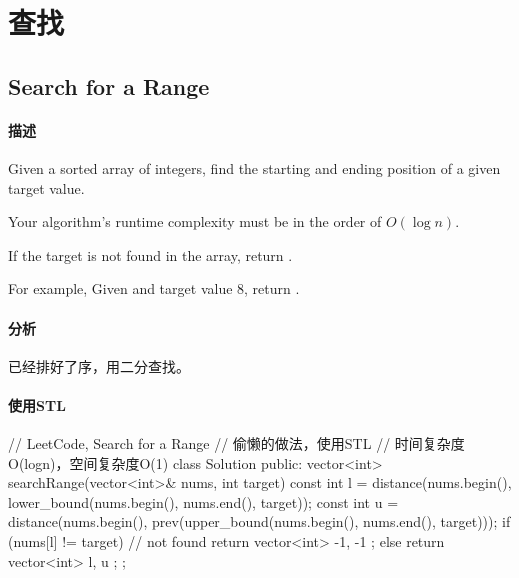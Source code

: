 \chapter{查找}


\section{Search for a Range} %
\label{sec:search-for-a-range}


\subsubsection{描述}
Given a sorted array of integers, find the starting and ending position of a given target value.

Your algorithm's runtime complexity must be in the order of $O(\log n)$.

If the target is not found in the array, return \code{[-1, -1]}.

For example,
Given \code{[5, 7, 7, 8, 8, 10]} and target value 8,
return \code{[3, 4]}.


\subsubsection{分析}
已经排好了序，用二分查找。


\subsubsection{使用STL}
\begin{Code}
// LeetCode, Search for a Range
// 偷懒的做法，使用STL
// 时间复杂度O(logn)，空间复杂度O(1)
class Solution {
public:
    vector<int> searchRange(vector<int>& nums, int target) {
        const int l = distance(nums.begin(), lower_bound(nums.begin(), nums.end(), target));
        const int u = distance(nums.begin(), prev(upper_bound(nums.begin(), nums.end(), target)));
        if (nums[l] != target) // not found
            return vector<int> { -1, -1 };
        else
            return vector<int> { l, u };
    }
};
\end{Code}


